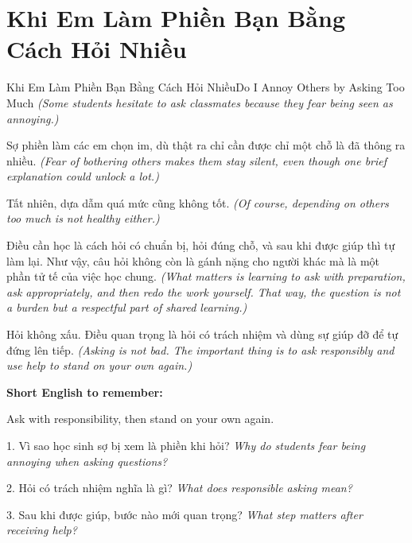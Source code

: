 \section{Khi Em Làm Phiền Bạn Bằng Cách Hỏi Nhiều}
\begin{truyen}{Khi Em Làm Phiền Bạn Bằng Cách Hỏi Nhiều}{Do I Annoy Others by Asking Too Much}
\textit{(Some students hesitate to ask classmates because they fear being seen as annoying.)}

Sợ phiền làm các em chọn im, dù thật ra chỉ cần được chỉ một chỗ là đã thông ra nhiều.
\textit{(Fear of bothering others makes them stay silent, even though one brief explanation could unlock a lot.)}

Tất nhiên, dựa dẫm quá mức cũng không tốt.
\textit{(Of course, depending on others too much is not healthy either.)}

Điều cần học là cách hỏi có chuẩn bị, hỏi đúng chỗ, và sau khi được giúp thì tự làm lại. Như vậy, câu hỏi không còn là gánh nặng cho người khác mà là một phần tử tế của việc học chung.
\textit{(What matters is learning to ask with preparation, ask appropriately, and then redo the work yourself. That way, the question is not a burden but a respectful part of shared learning.)}
\end{truyen}

\begin{baihoc}
Hỏi không xấu. Điều quan trọng là hỏi có trách nhiệm và dùng sự giúp đỡ để tự đứng lên tiếp.
\textit{(Asking is not bad. The important thing is to ask responsibly and use help to stand on your own again.)}
\end{baihoc}

\begin{ghinhoanh}
\textbf{Short English to remember:}

Ask with responsibility, then stand on your own again.

\end{ghinhoanh}

\begin{tuhocnhanh}
1. Vì sao học sinh sợ bị xem là phiền khi hỏi? \textit{Why do students fear being annoying when asking questions?}

2. Hỏi có trách nhiệm nghĩa là gì? \textit{What does responsible asking mean?}

3. Sau khi được giúp, bước nào mới quan trọng? \textit{What step matters after receiving help?}
\end{tuhocnhanh}
\ngancach

